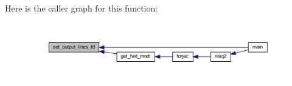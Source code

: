 Here is the caller graph for this function\+:\nopagebreak
\begin{figure}[H]
\begin{center}
\leavevmode
\includegraphics[width=350pt]{Leroi_8f90_a25dab6f0be9119c8c046915473136d9c_icgraph}
\end{center}
\end{figure}
\mbox{\label{Leroi_8f90_a2a5820b2a223f63d10cd7fe63469c604}} 
